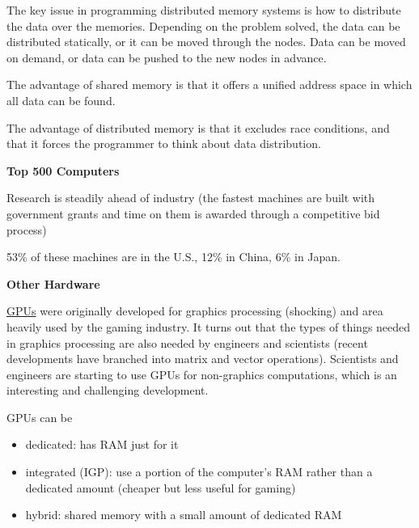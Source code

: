 \documentclass[12pt]{article}
\begin{document}
The key issue in programming distributed memory systems is how to distribute the data over the memories. Depending on the problem solved, the data can be distributed statically, or it can be moved through the nodes. Data can be moved on demand, or data can be pushed to the new nodes in advance. 

The advantage of shared memory is that it offers a unified address space in which all data can be found.

The advantage of distributed memory is that it excludes race conditions, and that it forces the programmer to think about data distribution.




\vspace*{2em}
\noindent \textbf{Top 500 Computers}

Research is steadily ahead of industry (the fastest machines are built with government grants and time on them is awarded through a competitive bid process)

53\% of these machines are in the U.S., 12\% in China, 6\% in Japan.

\vspace*{2em}
\noindent \textbf{Other Hardware}

\underline{GPUs} were originally developed for graphics processing (shocking) and area heavily used by the gaming industry. It turns out that the types of things needed in graphics processing are also needed by engineers and scientists (recent developments have branched into matrix and vector operations). Scientists and engineers are starting to use GPUs for non-graphics computations, which is an interesting and challenging development. 

GPUs can be 
\begin{itemize}
\item dedicated: has RAM just for it
\item integrated (IGP): use a portion of the computer's RAM rather than a dedicated amount (cheaper but less useful for gaming)
\item hybrid: shared memory with a small amount of dedicated RAM
\end{itemize}
\end{document}
